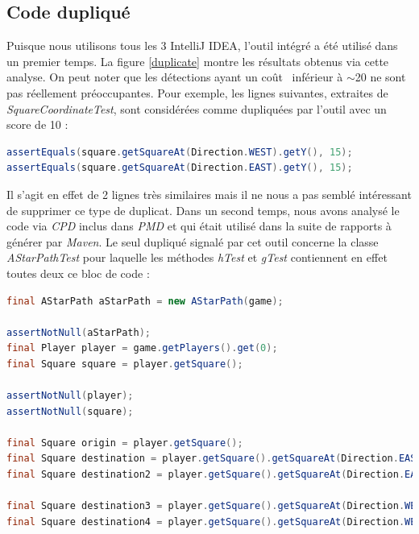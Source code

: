 \documentclass[12pt, openany]{report}
\begin{document}
\subsection{Code dupliqué}
Puisque nous utilisons tous les 3 IntelliJ IDEA, l'outil intégré a été utilisé dans un premier temps. La figure \ref{duplicate} montre les résultats obtenus via cette analyse.
On peut noter que les détections ayant un \og coût \fg \, inférieur à $\sim$20 ne sont pas réellement préoccupantes. Pour exemple, les lignes suivantes, extraites de \textit{SquareCoordinateTest}, sont considérées comme dupliquées par l'outil avec un score de 10 :
\begin{lstlisting}[language=java]
assertEquals(square.getSquareAt(Direction.WEST).getY(), 15);
assertEquals(square.getSquareAt(Direction.EAST).getY(), 15);
\end{lstlisting}
Il s'agit en effet de 2 lignes très similaires mais il ne nous a pas semblé intéressant de supprimer ce type de duplicat. 
Dans un second temps, nous avons analysé le code via \textit{CPD} inclus dans \textit{PMD} et qui était utilisé dans la suite de rapports à générer par \textit{Maven}. Le seul dupliqué signalé par cet outil concerne la classe \textit{AStarPathTest} pour laquelle les méthodes \textit{hTest} et \textit{gTest} contiennent en effet toutes deux ce bloc de code :
\begin{lstlisting}[language=java]
final AStarPath aStarPath = new AStarPath(game);

assertNotNull(aStarPath);
final Player player = game.getPlayers().get(0);
final Square square = player.getSquare();

assertNotNull(player);
assertNotNull(square);

final Square origin = player.getSquare();
final Square destination = player.getSquare().getSquareAt(Direction.EAST);
final Square destination2 = player.getSquare().getSquareAt(Direction.EAST).getSquareAt(Direction.EAST);

final Square destination3 = player.getSquare().getSquareAt(Direction.WEST);
final Square destination4 = player.getSquare().getSquareAt(Direction.WEST).getSquareAt(Direction.WEST);
\end{lstlisting}
\end{document}
